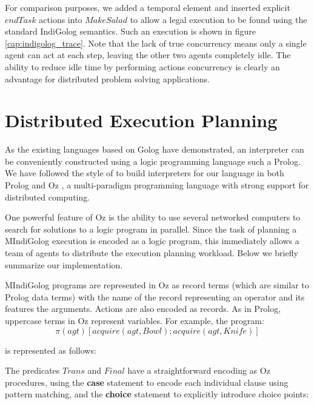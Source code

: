For comparison purposes, we added a temporal element and inserted
explicit $endTask$ actions into $MakeSalad$ to allow a legal execution
to be found using the standard IndiGolog semantics. Such an execution
is shown in figure \ref{cap:indigolog_trace}. Note that the lack
of true concurrency means only a single agent can act at each step,
leaving the other two agents completely idle. The ability to reduce
idle time by performing actions concurrency is clearly an advantage
for distributed problem solving applications.


\section{Distributed Execution Planning}

As the existing languages based on Golog have demonstrated, an interpreter
can be conveniently constructed using a logic programming language
such a Prolog. We have followed the style of \citet{giacomo00congolog,giacomo99indigolog}
to build interpreters for our language in both Prolog and Oz \citet{vanroy03mozart_logic},
a multi-paradigm programming language with strong support for distributed
computing.

One powerful feature of Oz is the ability to use several networked
computers to search for solutions to a logic program in parallel.
Since the task of planning a MIndiGolog execution is encoded as a
logic program, this immediately allows a team of agents to distribute
the execution planning workload. Below we briefly summarize our implementation.

MIndiGolog programs are represented in Oz as record terms (which are
similar to Prolog data terms) with the name of the record representing
an operator and its features the arguments. Actions are also encoded
as records. As in Prolog, uppercase terms in Oz represent variables.
For example, the program:\[
\pi(agt)\left[acquire(agt,Bowl);acquire(agt,Knife)\right]\]


is represented as follows:

{\small  }{\small \par}

The predicates $Trans$ and $Final$ have a straightforward encoding
as Oz procedures, using the \textbf{case} statement to encode each
individual clause using pattern matching, and the \textbf{choice}
statement to explicitly introduce choice points:

{\small  }{\small \par}

